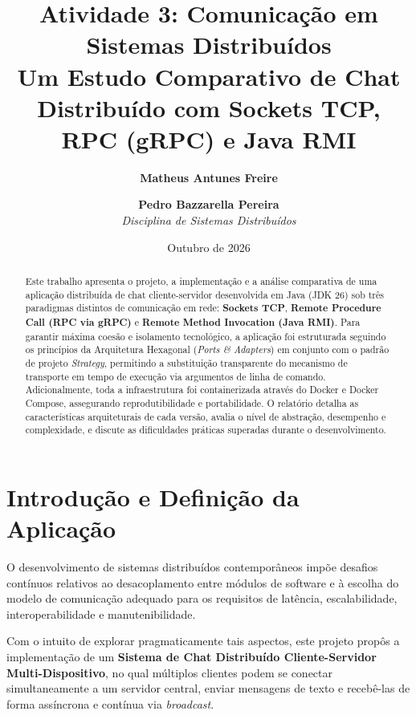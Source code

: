 \documentclass[12pt,a4paper]{article}
\title{
    \textbf{Atividade 3: Comunicação em Sistemas Distribuídos}\\
    \large Um Estudo Comparativo de Chat Distribuído com Sockets TCP, RPC (gRPC) e Java RMI
}
\author{
    \textbf{Matheus Antunes Freire} \and \textbf{Pedro Bazzarella Pereira} \\
    \textit{Disciplina de Sistemas Distribuídos}
}
\date{Outubro de 2026}
\begin{document}
\maketitle

\begin{abstract}
Este trabalho apresenta o projeto, a implementação e a análise comparativa de uma aplicação distribuída de chat cliente-servidor desenvolvida em Java (JDK 26) sob três paradigmas distintos de comunicação em rede: \textbf{Sockets TCP}, \textbf{Remote Procedure Call (RPC via gRPC)} e \textbf{Remote Method Invocation (Java RMI)}. Para garantir máxima coesão e isolamento tecnológico, a aplicação foi estruturada seguindo os princípios da Arquitetura Hexagonal (\textit{Ports \& Adapters}) em conjunto com o padrão de projeto \textit{Strategy}, permitindo a substituição transparente do mecanismo de transporte em tempo de execução via argumentos de linha de comando. Adicionalmente, toda a infraestrutura foi containerizada através do Docker e Docker Compose, assegurando reprodutibilidade e portabilidade. O relatório detalha as características arquiteturais de cada versão, avalia o nível de abstração, desempenho e complexidade, e discute as dificuldades práticas superadas durante o desenvolvimento.
\end{abstract}

\newpage
\tableofcontents
\newpage

\section{Introdução e Definição da Aplicação}

O desenvolvimento de sistemas distribuídos contemporâneos impõe desafios contínuos relativos ao desacoplamento entre módulos de software e à escolha do modelo de comunicação adequado para os requisitos de latência, escalabilidade, interoperabilidade e manutenibilidade. 

Com o intuito de explorar pragmaticamente tais aspectos, este projeto propôs a implementação de um \textbf{Sistema de Chat Distribuído Cliente-Servidor Multi-Dispositivo}, no qual múltiplos clientes podem se conectar simultaneamente a um servidor central, enviar mensagens de texto e recebê-las de forma assíncrona e contínua via \textit{broadcast}.
\end{document}
